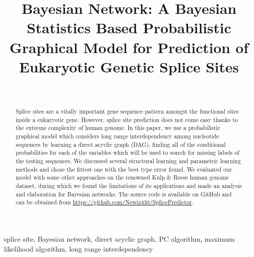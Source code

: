 \documentclass[journal,twoside]{IEEEtran}
\begin{document}
\title{Bayesian Network: A Bayesian Statistics Based Probabilistic Graphical Model for Prediction of Eukaryotic Genetic Splice Sites\\
}

\author{ \\
}

\maketitle

\begin{abstract}
Splice sites are a vitally important gene sequence pattern amongst the functional sites inside a eukaryotic gene. However, splice site prediction does not come easy thanks to the extreme complexity of human genome. In this paper, we use a probabilistic graphical model which considers long range interdependency among nucleotide sequences by learning a direct acyclic graph (DAG), finding all of the conditional probabilities for each of the variables which will be used to search for missing labels of the testing sequences. We discussed several structural learning and parametric learning methods and chose the fittest one with the best type \uppercase\expandafter{} error found. We evaluated our model with some other approaches on the renowned Kulp \& Reese human genome dataset, during which we found the limitations of its applications and made an analysis and elaboration for Bayesian networks. The source code is available on GitHub and can be obtained from \url{https://github.com/Newiz430/SplicePredictor}. 
\end{abstract}

\begin{IEEEkeywords}
splice site, Bayesian network, direct acyclic graph, PC algorithm, maximum likelihood algorithm, long range interdependency
\end{IEEEkeywords}
\end{document}
